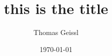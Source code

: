
\title{this is the title}
\author{Thomas Geissl}
\date{\today}
\newcommand{\institution}{Kunstuniversität Linz}
\newcommand{\department}{Tangible Music Lab}
\newcommand{\thetitle}{this is the title}
\newcommand{\subtitle}{this is the subtitle}
\newcommand{\theauthor}{demo author name}
\newcommand{\degree}{Master of Arts}
\newcommand{\supervisor}{Prof. Martin Kaltenbrunner}
\newcommand{\submissiondate}{October, 2025}


\thispagestyle{empty}
\newpage